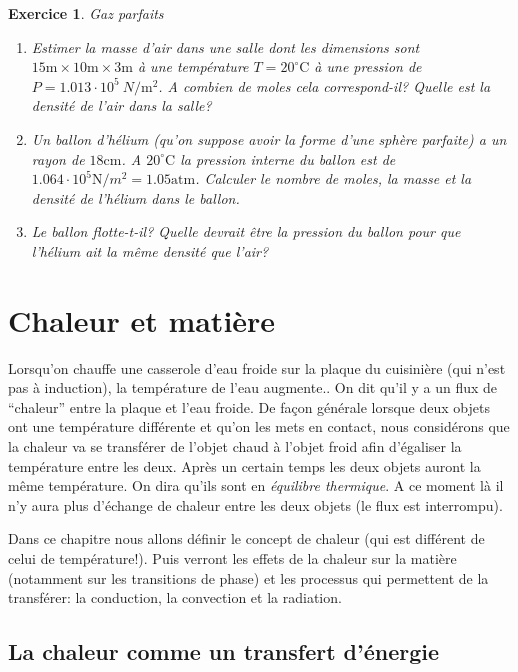 \documentclass[a4paper,12pt]{book}
\newtheorem{exercice}{Exercice}
\newcommand{\cm}{\mathrm{cm}}
\newcommand{\m}{\mathrm{m}}
\newcommand{\C}{\mathrm{C}}
\newcommand{\N}{\mathrm{N}}
\newcommand{\atm}{\mathrm{atm}}
\begin{document}
\begin{exercice}{Gaz parfaits}
\begin{enumerate}
\item Estimer la masse d'air dans une salle dont les dimensions sont $15\m\times 10\m\times 3\m$ à une température $T=20^\circ\C$
à une pression de $P=1.013\cdot 10^5\ N/\m^2$. A combien de moles cela correspond-il? Quelle est la densité de l'air dans la salle?


\item Un ballon d'hélium (qu'on suppose avoir la forme d'une sphère parfaite) a un rayon de $18\cm$. A $20^\circ\C$
la pression interne du ballon est de $1.064\cdot 10^5\N/m^2=1.05\atm$. Calculer le nombre de moles, la masse et la densité de l'hélium dans le ballon.

\item Le ballon flotte-t-il? Quelle devrait être la pression du ballon pour que l'hélium ait la même densité que l'air?
\end{enumerate}
\end{exercice}

\chapter{Chaleur et matière}

Lorsqu'on chauffe une casserole d'eau froide sur la plaque du cuisinière (qui n'est pas à induction), la température de l'eau augmente.. 
On dit qu'il y a un flux de ``chaleur'' entre la plaque et l'eau froide. De façon générale lorsque deux objets ont une température différente et qu'on les mets en contact, 
nous considérons que la chaleur va se transférer 
de l'objet chaud à l'objet froid afin d'égaliser la température entre les deux. Après un certain temps les deux objets auront la même
température. On dira qu'ils sont en \textit{équilibre thermique}.
A ce moment là il n'y aura plus d'échange de chaleur entre les deux objets (le flux est interrompu). 

Dans ce chapitre nous allons définir le concept de chaleur (qui
est différent de celui de température!). Puis verront les effets 
de la chaleur sur la matière (notamment sur les transitions de phase) et les processus qui permettent de la transférer: 
la conduction, la convection et la radiation.


\section{La chaleur comme un transfert d'énergie}
\end{document}
